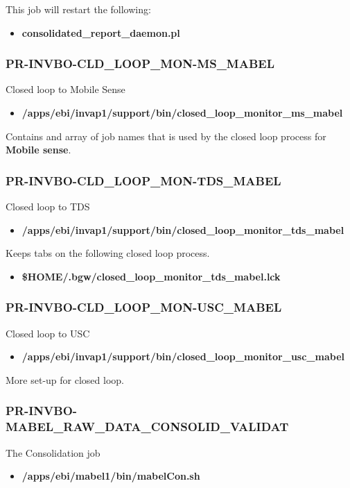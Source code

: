 \documentclass[12pt,twoside]{article}
\begin{document}
This job will restart the following:
\begin{itemize}
\item \textbf{consolidated\_report\_daemon.pl}
\end{itemize}
\subsubsection{PR-INVBO-CLD\_LOOP\_MON-MS\_MABEL}
\label{sec:orgheadline40}
Closed loop to Mobile Sense
\begin{itemize}
\item \textbf{/apps/ebi/invap1/support/bin/closed\_loop\_monitor\_ms\_mabel}
\end{itemize}

Contains and array of job names that is used by the closed loop process for \textbf{Mobile sense}.
\subsubsection{PR-INVBO-CLD\_LOOP\_MON-TDS\_MABEL}
\label{sec:orgheadline41}
Closed loop to TDS
\begin{itemize}
\item \textbf{/apps/ebi/invap1/support/bin/closed\_loop\_monitor\_tds\_mabel}
\end{itemize}

Keeps tabs on the following closed loop process.
\begin{itemize}
\item \textbf{\$HOME/.bgw/closed\_loop\_monitor\_tds\_mabel.lck}
\end{itemize}
\subsubsection{PR-INVBO-CLD\_LOOP\_MON-USC\_MABEL}
\label{sec:orgheadline42}
Closed loop to USC
\begin{itemize}
\item \textbf{/apps/ebi/invap1/support/bin/closed\_loop\_monitor\_usc\_mabel}
\end{itemize}

More set-up for closed loop.
\subsubsection{PR-INVBO-MABEL\_RAW\_DATA\_CONSOLID\_VALIDAT}
\label{sec:orgheadline43}
The Consolidation job
\begin{itemize}
\item \textbf{/apps/ebi/mabel1/bin/mabelCon.sh}
\end{itemize}
\end{document}
